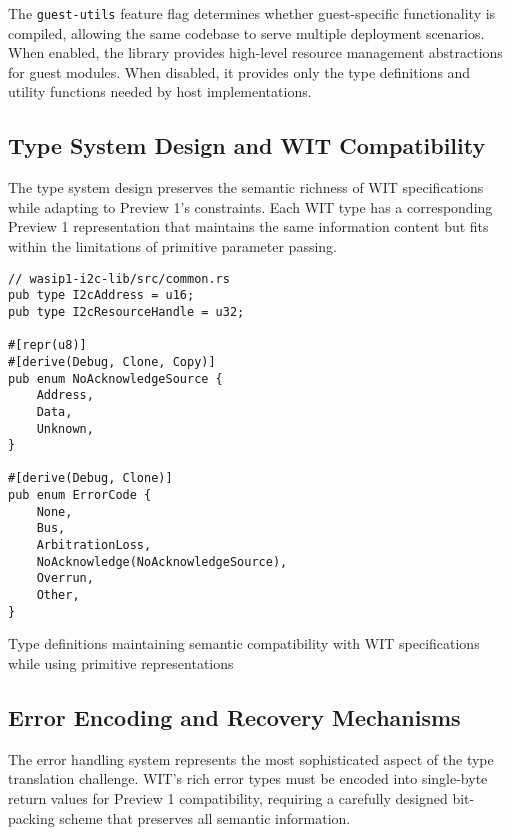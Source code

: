 The \texttt{guest-utils} feature flag determines whether guest-specific functionality is compiled, allowing the same codebase to serve multiple deployment scenarios. When enabled, the library provides high-level resource management abstractions for guest modules. When disabled, it provides only the type definitions and utility functions needed by host implementations.

\subsection{Type System Design and WIT Compatibility}

The type system design preserves the semantic richness of WIT specifications while adapting to Preview 1's constraints. Each WIT type has a corresponding Preview 1 representation that maintains the same information content but fits within the limitations of primitive parameter passing.

\begin{listing}[H]
\begin{verbatim}
// wasip1-i2c-lib/src/common.rs
pub type I2cAddress = u16;
pub type I2cResourceHandle = u32;

#[repr(u8)]
#[derive(Debug, Clone, Copy)]
pub enum NoAcknowledgeSource {
    Address,
    Data,
    Unknown,
}

#[derive(Debug, Clone)]
pub enum ErrorCode {
    None,
    Bus,
    ArbitrationLoss,
    NoAcknowledge(NoAcknowledgeSource),
    Overrun,
    Other,
}
\end{verbatim}
\caption{Type definitions maintaining semantic compatibility with WIT specifications while using primitive representations}
\label{lst:type-definitions}
\end{listing}

\subsection{Error Encoding and Recovery Mechanisms}

The error handling system represents the most sophisticated aspect of the type translation challenge. WIT's rich error types must be encoded into single-byte return values for Preview 1 compatibility, requiring a carefully designed bit-packing scheme that preserves all semantic information.

